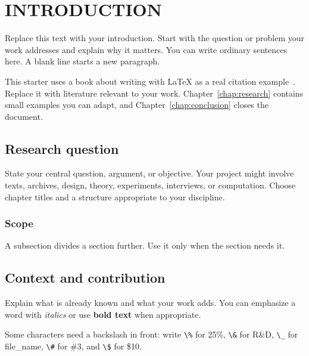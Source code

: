 \chapter{INTRODUCTION}
\label{chap:introduction}

Replace this text with your introduction. Start with the question or problem
your work addresses and explain why it matters. You can write ordinary sentences
here. A blank line starts a new paragraph.

This starter uses a book about writing with LaTeX as a real citation
example~\parencite{lamport1994}. Replace it with literature relevant to your work.
Chapter~\ref{chap:research} contains small examples you can adapt, and
Chapter~\ref{chap:conclusion} closes the document.

\section{Research question}
State your central question, argument, or objective. Your project might involve
texts, archives, design, theory, experiments, interviews, or computation.
Choose chapter titles and a structure appropriate to your discipline.

\subsection{Scope}
A subsection divides a section further. Use it only when the section needs it.

\section{Context and contribution}
Explain what is already known and what your work adds. You can emphasize a
word with \emph{italics} or use \textbf{bold text} when appropriate.

Some characters need a backslash in front: write \verb|\%| for 25\%,
\verb|\&| for R\&D, \verb|\_| for file\_name, \verb|\#| for \#3, and
\verb|\$| for \$10.
